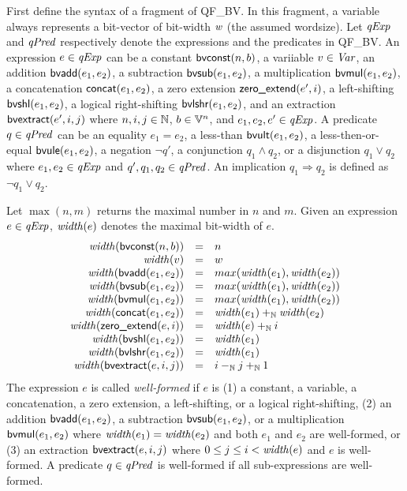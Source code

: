 
First define the syntax of a fragment of QF\_BV.
In this fragment, a variable always represents a bit-vector of bit-width $\mathit{w}$ (the assumed wordsize).
Let $\mathit{qExp}$ and $\mathit{qPred}$ respectively denote the expressions and the predicates in QF\_BV.
An expression $e \in \mathit{qExp}$ can be a constant $\mbox{\textsf{bvconst}}(n, b)$, a variiable $v \in \mathit{Var}$, an addition $\mbox{\textsf{bvadd}}(e_1, e_2)$, a subtraction $\mbox{\textsf{bvsub}}(e_1, e_2)$, a multiplication $\mbox{\textsf{bvmul}}(e_1, e_2)$, a concatenation $\mbox{\textsf{concat}}(e_1, e_2)$, a zero extension $\mbox{\textsf{zero\_extend}}(e', i)$, a left-shifting $\mbox{\textsf{bvshl}}(e_1, e_2)$, a logical right-shifting $\mbox{\textsf{bvlshr}}(e_1, e_2)$, and an extraction $\mbox{\textsf{bvextract}}(e', i, j)$ where $n, i, j \in \mathbb{N}$, $b \in \mathbb{V}^n$, and $e_1, e_2, e' \in \mathit{qExp}$.
A predicate $q \in \mathit{qPred}$ can be an equality $e_1 = e_2$, a less-than $\mbox{\textsf{bvult}}(e_1, e_2)$, a less-then-or-equal $\mbox{\textsf{bvule}}(e_1, e_2)$, a negation $\neg q'$, a conjunction $q_1 \wedge q_2$, or a disjunction $q_1 \vee q_2$ where $e_1, e_2 \in \mathit{qExp}$ and $q', q_1, q_2 \in \mathit{qPred}$.
An implication $q_1 \Rightarrow q_2$ is defined as $\neg q_1 \vee q_2$.

Let $\max(n, m)$ returns the maximal number in $n$ and $m$.
Given an expression $e \in \mathit{qExp}$, $\mathit{width}(e)$ denotes the maximal bit-width of $e$.
\[
\begin{array}{rcl}
\mathit{width}(\mbox{\textsf{bvconst}}(n, b)) & = & n \\
\mathit{width}(v) & = & w \\
\mathit{width}(\mbox{\textsf{bvadd}}(e_1, e_2)) & = & max(\mathit{width}(e_1), \mathit{width}(e_2))\\
\mathit{width}(\mbox{\textsf{bvsub}}(e_1, e_2)) & = & max(\mathit{width}(e_1), \mathit{width}(e_2))\\
\mathit{width}(\mbox{\textsf{bvmul}}(e_1, e_2)) & = & max(\mathit{width}(e_1), \mathit{width}(e_2))\\
\mathit{width}(\mbox{\textsf{concat}}(e_1, e_2)) & = & \mathit{width}(e_1) +_{\mathbb{N}} \mathit{width}(e_2)\\
\mathit{width}(\mbox{\textsf{zero\_extend}}(e, i)) & = & \mathit{width}(e) +_{\mathbb{N}} i \\
\mathit{width}(\mbox{\textsf{bvshl}}(e_1, e_2)) & = & \mathit{width}(e_1) \\
\mathit{width}(\mbox{\textsf{bvlshr}}(e_1, e_2)) & = & \mathit{width}(e_1) \\
\mathit{width}(\mbox{\textsf{bvextract}}(e, i, j)) & = & i -_{\mathbb{N}} j +_{\mathbb{N}} 1 \\
\end{array}
\]
The expression $e$ is called \emph{well-formed} if $e$ is (1) a constant, a variable, a concatenation, a zero extension, a left-shifting, or a logical right-shifting, (2) an addition $\mbox{\textsf{bvadd}}(e_1, e_2)$, a subtraction $\mbox{\textsf{bvsub}}(e_1, e_2)$, or a multiplication $\mbox{\textsf{bvmul}}(e_1, e_2)$ where $\mathit{width}(e_1) = \mathit{width}(e_2)$ and both $e_1$ and $e_2$ are well-formed, or (3) an extraction $\mbox{\textsf{bvextract}}(e, i, j)$ where $0 \leq j \leq i < \mathit{width}(e)$ and $e$ is well-formed.
A predicate $q \in \mathit{qPred}$ is well-formed if all sub-expressions are well-formed.

